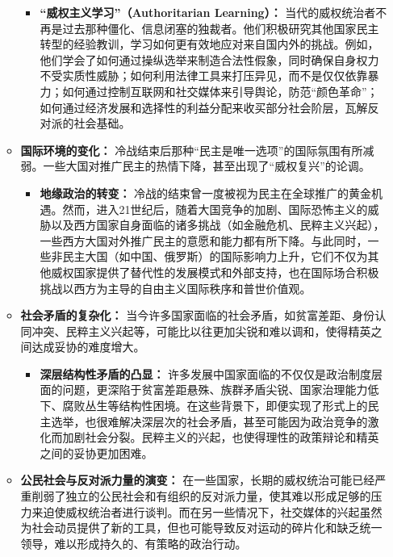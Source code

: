 \documentclass[UTF8, 10pt]{ctexbook}
\begin{document}
\begin{itemize}
\begin{itemize}
        \begin{itemize}
            \item \textbf{“威权主义学习”（Authoritarian Learning）：} 当代的威权统治者不再是过去那种僵化、信息闭塞的独裁者。他们积极研究其他国家民主转型的经验教训，学习如何更有效地应对来自国内外的挑战。例如，他们学会了如何通过操纵选举来制造合法性假象，同时确保自身权力不受实质性威胁；如何利用法律工具来打压异见，而不是仅仅依靠暴力；如何通过控制互联网和社交媒体来引导舆论，防范“颜色革命”；如何通过经济发展和选择性的利益分配来收买部分社会阶层，瓦解反对派的社会基础。
        \end{itemize}
        \item \textbf{国际环境的变化：} 冷战结束后那种“民主是唯一选项”的国际氛围有所减弱。一些大国对推广民主的热情下降，甚至出现了“威权复兴”的论调。
        \begin{itemize}
            \item \textbf{地缘政治的转变：} 冷战的结束曾一度被视为民主在全球推广的黄金机遇。然而，进入21世纪后，随着大国竞争的加剧、国际恐怖主义的威胁以及西方国家自身面临的诸多挑战（如金融危机、民粹主义兴起），一些西方大国对外推广民主的意愿和能力都有所下降。与此同时，一些非民主大国（如中国、俄罗斯）的国际影响力上升，它们不仅为其他威权国家提供了替代性的发展模式和外部支持，也在国际场合积极挑战以西方为主导的自由主义国际秩序和普世价值观。
        \end{itemize}
        \item \textbf{社会矛盾的复杂化：} 当今许多国家面临的社会矛盾，如贫富差距、身份认同冲突、民粹主义兴起等，可能比以往更加尖锐和难以调和，使得精英之间达成妥协的难度增大。
        \begin{itemize}
            \item \textbf{深层结构性矛盾的凸显：} 许多发展中国家面临的不仅仅是政治制度层面的问题，更深陷于贫富差距悬殊、族群矛盾尖锐、国家治理能力低下、腐败丛生等结构性困境。在这些背景下，即便实现了形式上的民主选举，也很难解决深层次的社会矛盾，甚至可能因为政治竞争的激化而加剧社会分裂。民粹主义的兴起，也使得理性的政策辩论和精英之间的妥协更加困难。
        \end{itemize}
        \item \textbf{公民社会与反对派力量的演变：} 在一些国家，长期的威权统治可能已经严重削弱了独立的公民社会和有组织的反对派力量，使其难以形成足够的压力来迫使威权统治者进行谈判。而在另一些情况下，社交媒体的兴起虽然为社会动员提供了新的工具，但也可能导致反对运动的碎片化和缺乏统一领导，难以形成持久的、有策略的政治行动。
    \end{itemize}
\end{itemize}
\end{document}
